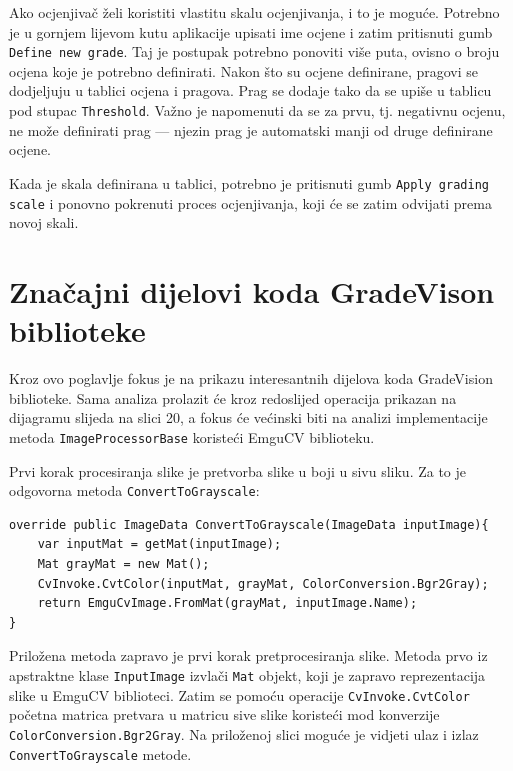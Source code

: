 \documentclass{foi}
\begin{document}
Ako ocjenjivač želi koristiti vlastitu skalu ocjenjivanja, i to je moguće. Potrebno je u gornjem lijevom kutu aplikacije upisati ime ocjene i zatim pritisnuti gumb \texttt{Define new grade}. Taj je postupak potrebno ponoviti više puta, ovisno o broju ocjena koje je potrebno definirati. Nakon što su ocjene definirane, pragovi se dodjeljuju u tablici ocjena i pragova. Prag se dodaje tako da se upiše u tablicu pod stupac \texttt{Threshold}. Važno je napomenuti da se za prvu, tj. negativnu ocjenu, ne može definirati prag — njezin prag je automatski manji od druge definirane ocjene.

Kada je skala definirana u tablici, potrebno je pritisnuti gumb \texttt{Apply grading scale} i ponovno pokrenuti proces ocjenjivanja, koji će se zatim odvijati prema novoj skali.

\section{Značajni dijelovi koda GradeVison biblioteke}

Kroz ovo poglavlje fokus je na prikazu interesantnih dijelova koda GradeVision biblioteke. Sama analiza prolazit će kroz redoslijed operacija prikazan na dijagramu slijeda na slici 20, a fokus će većinski biti na analizi implementacije metoda \texttt{ImageProcessorBase} koristeći EmguCV biblioteku.

Prvi korak procesiranja slike je pretvorba slike u boji u sivu sliku. Za to je odgovorna metoda \texttt{ConvertToGrayscale}:

\begin{lstlisting}[caption={Metoda za konverziju slike u boji u sivu sliku}]
override public ImageData ConvertToGrayscale(ImageData inputImage){
    var inputMat = getMat(inputImage);
    Mat grayMat = new Mat();
    CvInvoke.CvtColor(inputMat, grayMat, ColorConversion.Bgr2Gray);
    return EmguCvImage.FromMat(grayMat, inputImage.Name);
}
\end{lstlisting} 

Priložena metoda zapravo je prvi korak pretprocesiranja slike. Metoda prvo iz apstraktne klase \texttt{InputImage} izvlači \texttt{Mat} objekt, koji je zapravo reprezentacija slike u EmguCV biblioteci. Zatim se pomoću operacije \texttt{CvInvoke.CvtColor} početna matrica pretvara u matricu sive slike koristeći mod konverzije \texttt{ColorConversion.Bgr2Gray}. Na priloženoj slici moguće je vidjeti ulaz i izlaz \texttt{ConvertToGrayscale} metode.
\end{document}
